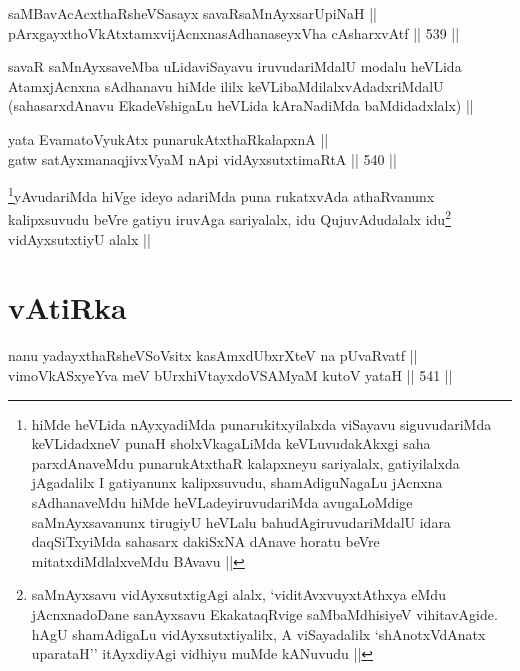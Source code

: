 
\begin{shl}
saMBavAcAcxthaRsheVSasayx savaRsaMnAyxsarUpiNaH || \\
pArxgayxthoVkAtxtamxvijAcnxnasAdhanaseyxVha cAsharxvAtf ||  539 ||  
\end{shl}

\begin{artha}
savaR saMnAyxsaveMba uLidaviSayavu iruvudariMdalU modalu heVLida
AtamxjAcnxna sAdhanavu hiMde ililx keVLibaMdilalxvAdadxriMdalU
(sahasarxdAnavu EkadeVshigaLu heVLida kAraNadiMda baMdidadxlalx) ||
\end{artha}

\begin{shl}
yata EvamatoV\s yukAtx punarukAtxthaRkalapxnA || \\
gatw satAyxmanaqjivxVyaM nApi vidAyxsutxtimaRtA ||  540 ||  
\end{shl}

\begin{artha}
\footnote{hiMde heVLida nAyxyadiMda punarukitxyilalxda viSayavu
  siguvudariMda keVLidadxneV punaH sholxVkagaLiMda keVLuvudakAkxgi
  saha parxdAnaveMdu punarukAtxthaR kalapxneyu sariyalalx,
  gatiyilalxda jAgadalilx I gatiyanunx kalipxsuvudu, shamAdiguNagaLu
  jAcnxna sAdhanaveMdu hiMde heVLadeyiruvudariMda avugaLoMdige
  saMnAyxsavanunx tirugiyU heVLalu bahudAgiruvudariMdalU idara
  daqSiTxyiMda sahasarx dakiSxNA dAnave horatu beVre
  mitatxdiMdlalxveMdu BAvavu ||}yAvudariMda hiVge ideyo adariMda puna rukatxvAda
athaRvanunx kalipxsuvudu beVre gatiyu iruvAga sariyalalx, idu
QujuvAdudalalx idu\footnote{saMnAyxsavu vidAyxsutxtigAgi alalx,
  `viditAvxvuyxtAthxya eMdu jAcnxnadoDane sanAyxsavu EkakataqRvige
  saMbaMdhisiyeV vihitavAgide. hAgU shamAdigaLu vidAyxsutxtiyalilx, A
  viSayadalilx `shAnotxVdAnatx uparataH'' itAyxdiyAgi vidhiyu muMde
  kANuvudu ||} vidAyxsutxtiyU alalx ||
\end{artha}

\section*{vAtiRka}


\begin{shl}
nanu yadayxthaRsheVSoV\s sitx kasAmxdUbxrXteV na pUvaRvatf || \\
vimoVkASxyeYva meV bUrxhiVtayxdoVSAM\s yaM kutoV yataH ||  541 ||  
\end{shl}

